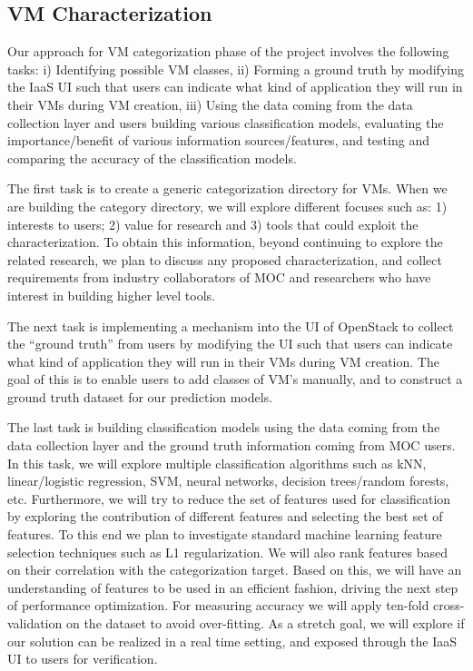 \subsection{VM Characterization}

Our approach for VM categorization phase of the project involves the following tasks: i) Identifying possible VM classes, ii) Forming a ground truth by modifying the IaaS UI such that users can indicate what kind of application they will run in their VMs during VM creation, iii) Using the data coming from the data collection layer and users building various classification models, evaluating the importance/benefit of various information sources/features, and testing and comparing the accuracy of the classification models.  

The first task is to create a generic categorization directory for VMs. When we are building the category directory, we will explore different focuses such as: 1) interests to users; 2) value for research and 3) tools that could exploit the characterization. To obtain this information, beyond continuing to explore the related research, we plan to discuss any proposed characterization, and collect requirements from industry collaborators of MOC and researchers who have interest in building higher level tools. 

The next task is implementing a mechanism into the UI of OpenStack to collect the ``ground truth'' from users by modifying the UI such that users can indicate what kind of application they will run in their VMs during VM creation. The goal of this is to enable users to add classes of VM's manually, and to construct a ground truth dataset for our prediction models.

The last task is building classification models using the data coming from the data collection layer and the ground truth information coming from MOC users. In this task, we will explore multiple classification algorithms such as kNN, linear/logistic regression, SVM, neural networks, decision trees/random forests, etc. Furthermore, we will try to reduce the set of features used for classification by exploring the contribution of different features and selecting the best set of features. To this end we plan to investigate standard machine learning feature selection techniques such as L1 regularization. We will also rank features based on their correlation with the categorization target. Based on this, we will have an understanding of features to be used in an efficient fashion, driving the next step of performance optimization. For measuring accuracy we will apply ten-fold cross-validation on the dataset to avoid over-fitting. As a stretch goal, we will explore if our solution can be realized in a real time setting, and exposed through the IaaS UI to users for verification.
